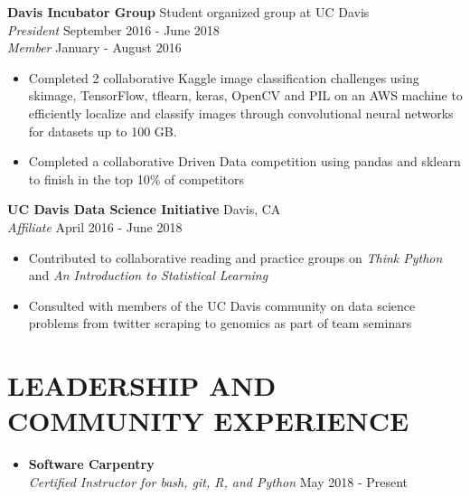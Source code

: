 \documentclass[line,margin,10pt]{res}
\begin{document}
\begin{resume}
\textbf{Davis Incubator Group} \hfill Student organized group at UC Davis\\
{\sl President} \hfill September 2016 - June 2018\\
{\sl Member} \hfill January - August 2016 
\begin{itemize} \itemsep -2pt
\item Completed 2 collaborative Kaggle image classification challenges using skimage, TensorFlow, tflearn, keras, OpenCV and PIL on an AWS machine to efficiently localize and classify images through convolutional neural networks for datasets up to 100 GB.
\item Completed a collaborative Driven Data competition using pandas and sklearn to finish in the top 10\% of competitors
\end{itemize}

\textbf{UC Davis Data Science Initiative} \hfill  Davis, CA \\
{\sl Affiliate} \hfill April 2016 - June 2018
\begin{itemize} \itemsep -2pt
\item Contributed to collaborative reading and practice groups on {\sl Think Python} and {\sl An Introduction to Statistical Learning} 
\item Consulted with members of the UC Davis community on data science problems from twitter scraping to genomics as part of team seminars
\end{itemize}
 
\section{LEADERSHIP AND COMMUNITY EXPERIENCE}
\begin{itemize}\itemsep -2pt

\item [] \textbf{Software Carpentry} \\ {\sl Certified Instructor for bash, git, R, and Python} \hfill May 2018 - Present


\end{itemize}
\end{resume}
\end{document}
